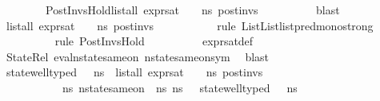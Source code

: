 \begin{isabellebody}
\ \ \ \ \ \ \ \ PostInvsHold{\isacharcolon}{\kern0pt}{\isachardoublequoteopen}list{\isacharunderscore}{\kern0pt}all\ {\isacharparenleft}{\kern0pt}expr{\isacharunderscore}{\kern0pt}sat\ {\isasymLambda}\ {\isasymGamma}\ {\isasymOmega}\ ns{}{\isacharprime}{\kern0pt}{\isacharprime}{\kern0pt}{\isacharparenright}{\kern0pt}\ post{\isacharunderscore}{\kern0pt}invs{\isachardoublequoteclose}\isanewline
\ \ \ \ \ \ \ \ \isamarkupfalse%
\ blast\isanewline
\ \ \ \ \ \ \isamarkupfalse%
\ {\isachardoublequoteopen}list{\isacharunderscore}{\kern0pt}all\ {\isacharparenleft}{\kern0pt}expr{\isacharunderscore}{\kern0pt}sat\ {\isasymLambda}\ {\isasymGamma}\ {\isasymOmega}\ ns{\isacharprime}{\kern0pt}{\isacharparenright}{\kern0pt}\ post{\isacharunderscore}{\kern0pt}invs{\isachardoublequoteclose}\ \isanewline
\ \ \ \ \ \ \ \ \isamarkupfalse%
\ {\isacharparenleft}{\kern0pt}rule\ List{\isachardot}{\kern0pt}List{\isachardot}{\kern0pt}list{\isachardot}{\kern0pt}pred{\isacharunderscore}{\kern0pt}mono{\isacharunderscore}{\kern0pt}strong{\isacharparenright}{\kern0pt}\isanewline
\ \ \ \ \ \ \ \ \isamarkupfalse%
\ {\isacharparenleft}{\kern0pt}rule\ PostInvsHold{\isacharparenright}{\kern0pt}\isanewline
\ \ \ \ \ \ \ \ \isamarkupfalse%
\ expr{\isacharunderscore}{\kern0pt}sat{\isacharunderscore}{\kern0pt}def\isanewline
\ \ \ \ \ \ \ \ \isamarkupfalse%
\ StateRel{}\ eval{\isacharunderscore}{\kern0pt}nstate{\isacharunderscore}{\kern0pt}same{\isacharunderscore}{\kern0pt}on{\isacharparenleft}{\kern0pt}{}{\isacharparenright}{\kern0pt}\ nstate{\isacharunderscore}{\kern0pt}same{\isacharunderscore}{\kern0pt}on{\isacharunderscore}{\kern0pt}sym\ \isamarkupfalse%
\ blast\isanewline
\ \ \ \ \ \isanewline
\ \ \ \ \ \ \isamarkupfalse%
\ {\isachardoublequoteopen}state{\isacharunderscore}{\kern0pt}well{\isacharunderscore}{\kern0pt}typed\ {\isasymLambda}\ {\isasymOmega}\ ns{\isacharprime}{\kern0pt}\ {\isasymand}\ list{\isacharunderscore}{\kern0pt}all\ {\isacharparenleft}{\kern0pt}expr{\isacharunderscore}{\kern0pt}sat\ {\isasymLambda}\ {\isasymGamma}\ {\isasymOmega}\ ns{\isacharprime}{\kern0pt}{\isacharparenright}{\kern0pt}\ post{\isacharunderscore}{\kern0pt}invs\ {\isasymand}\ \isanewline
\ \ \ \ \ \ \ \ \ \ \ {\isacharparenleft}{\kern0pt}{\isacharparenleft}{\kern0pt}{\isasymexists}ns{}{\isacharprime}{\kern0pt}{\isachardot}{\kern0pt}\ nstate{\isacharunderscore}{\kern0pt}same{\isacharunderscore}{\kern0pt}on\ {\isasymLambda}\ ns{\isacharprime}{\kern0pt}\ ns{}{\isacharprime}{\kern0pt}\ {\isacharbraceleft}{\kern0pt}{\isacharbraceright}{\kern0pt}\ {\isasymand}\ state{\isacharunderscore}{\kern0pt}well{\isacharunderscore}{\kern0pt}typed\ {\isasymLambda}\ {\isasymOmega}\ ns{}{\isacharprime}{\kern0pt}\ {\isasymand}\isanewline

\end{isabellebody}
